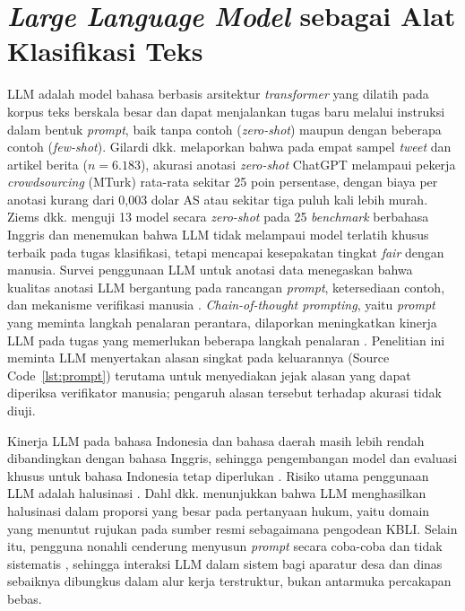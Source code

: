 \section{\textit{Large Language Model} sebagai Alat Klasifikasi Teks}
\label{sec:llm}

LLM adalah model bahasa berbasis arsitektur \textit{transformer} yang dilatih pada korpus teks berskala besar dan dapat menjalankan tugas baru melalui instruksi dalam bentuk \textit{prompt}, baik tanpa contoh (\textit{zero-shot}) maupun dengan beberapa contoh (\textit{few-shot}). Gilardi dkk. \cite{gilardi2023chatgpt} melaporkan bahwa pada empat sampel \textit{tweet} dan artikel berita ($n = 6.183$), akurasi anotasi \textit{zero-shot} ChatGPT melampaui pekerja \textit{crowdsourcing} (MTurk) rata-rata sekitar 25 poin persentase, dengan biaya per anotasi kurang dari 0,003 dolar AS atau sekitar tiga puluh kali lebih murah. Ziems dkk. \cite{ziems2024css} menguji 13 model secara \textit{zero-shot} pada 25 \textit{benchmark} berbahasa Inggris dan menemukan bahwa LLM tidak melampaui model terlatih khusus terbaik pada tugas klasifikasi, tetapi mencapai kesepakatan tingkat \textit{fair} dengan manusia. Survei penggunaan LLM untuk anotasi data menegaskan bahwa kualitas anotasi LLM bergantung pada rancangan \textit{prompt}, ketersediaan contoh, dan mekanisme verifikasi manusia \cite{tan2024annotation}. \textit{Chain-of-thought prompting}, yaitu \textit{prompt} yang meminta langkah penalaran perantara, dilaporkan meningkatkan kinerja LLM pada tugas yang memerlukan beberapa langkah penalaran \cite{wei2022cot}. Penelitian ini meminta LLM menyertakan alasan singkat pada keluarannya (Source Code~\ref{lst:prompt}) terutama untuk menyediakan jejak alasan yang dapat diperiksa verifikator manusia; pengaruh alasan tersebut terhadap akurasi tidak diuji.

Kinerja LLM pada bahasa Indonesia dan bahasa daerah masih lebih rendah dibandingkan dengan bahasa Inggris, sehingga pengembangan model dan evaluasi khusus untuk bahasa Indonesia tetap diperlukan \cite{cahyawijaya2024cendol}. Risiko utama penggunaan LLM adalah halusinasi \cite{ji2023hallucination}. Dahl dkk. \cite{dahl2024legal} menunjukkan bahwa LLM menghasilkan halusinasi dalam proporsi yang besar pada pertanyaan hukum, yaitu domain yang menuntut rujukan pada sumber resmi sebagaimana pengodean KBLI. Selain itu, pengguna nonahli cenderung menyusun \textit{prompt} secara coba-coba dan tidak sistematis \cite{zamfirescu2023johnny}, sehingga interaksi LLM dalam sistem bagi aparatur desa dan dinas sebaiknya dibungkus dalam alur kerja terstruktur, bukan antarmuka percakapan bebas.

